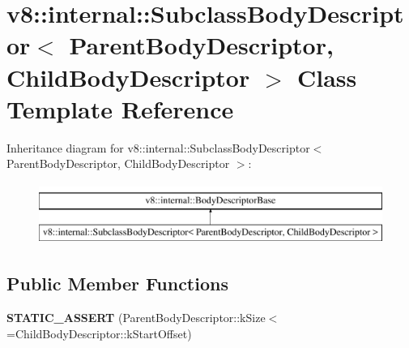 \hypertarget{classv8_1_1internal_1_1SubclassBodyDescriptor}{}\section{v8\+:\+:internal\+:\+:Subclass\+Body\+Descriptor$<$ Parent\+Body\+Descriptor, Child\+Body\+Descriptor $>$ Class Template Reference}
\label{classv8_1_1internal_1_1SubclassBodyDescriptor}
Inheritance diagram for v8\+:\+:internal\+:\+:Subclass\+Body\+Descriptor$<$ Parent\+Body\+Descriptor, Child\+Body\+Descriptor $>$\+:\begin{figure}[H]
\begin{center}
\leavevmode
\includegraphics[height=2.000000cm]{classv8_1_1internal_1_1SubclassBodyDescriptor}
\end{center}
\end{figure}
\subsection*{Public Member Functions}
\begin{DoxyCompactItemize}
\item 
\mbox{\label{classv8_1_1internal_1_1SubclassBodyDescriptor_adb0df358168382b46a3900e6a74e0ee6}} 
{\bfseries S\+T\+A\+T\+I\+C\+\_\+\+A\+S\+S\+E\+RT} (Parent\+Body\+Descriptor\+::k\+Size$<$=Child\+Body\+Descriptor\+::k\+Start\+Offset)
\end{DoxyCompactItemize}
